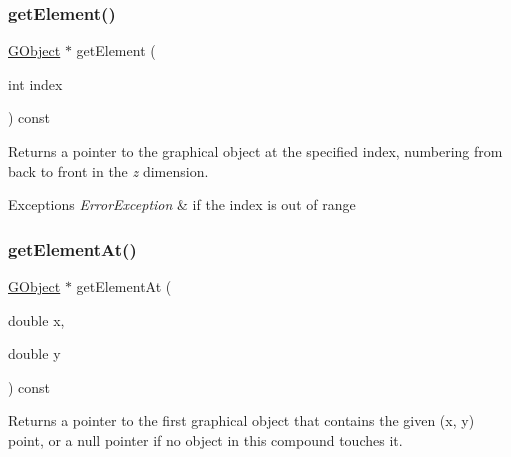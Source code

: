 \subsubsection{\texorpdfstring{get\+Element()}{getElement()}}
{\footnotesize\ttfamily \mbox{\hyperlink{classsgl_1_1GObject}{G\+Object}} $\ast$ get\+Element (\begin{DoxyParamCaption}\item[{int}]{index }\end{DoxyParamCaption}) const\hspace{0.3cm}{\ttfamily [virtual]}}



Returns a pointer to the graphical object at the specified index, numbering from back to front in the {\itshape z} dimension. 


\begin{DoxyExceptions}{Exceptions}
{\em Error\+Exception} & if the index is out of range \\
\hline
\end{DoxyExceptions}
\mbox{\label{classsgl_1_1GCompound_a25efa999eca5790ec26ef091b05f961c}} 
\subsubsection{\texorpdfstring{get\+Element\+At()}{getElementAt()}}
{\footnotesize\ttfamily \mbox{\hyperlink{classsgl_1_1GObject}{G\+Object}} $\ast$ get\+Element\+At (\begin{DoxyParamCaption}\item[{double}]{x,  }\item[{double}]{y }\end{DoxyParamCaption}) const\hspace{0.3cm}{\ttfamily [virtual]}}



Returns a pointer to the first graphical object that contains the given (x, y) point, or a null pointer if no object in this compound touches it. 

\mbox{\label{classsgl_1_1GCompound_adf7d37ec315f859648def92e6b32408f}} 
